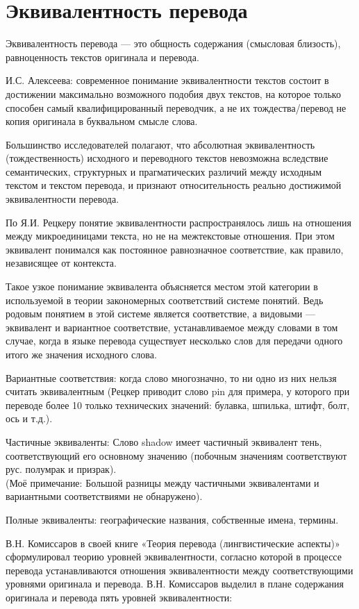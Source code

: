 \section{Эквивалентность перевода}

Эквивалентность перевода --- это общность содержания (смысловая близость), равноценность текстов оригинала и перевода.

И.С. Алексеева: современное понимание эквивалентности текстов состоит в достижении максимально возможного подобия двух текстов, на которое только способен самый квалифицированный переводчик, а не их тождества/перевод не копия оригинала в буквальном смысле слова.

Большинство исследователей полагают, что абсолютная эквивалентность (тождественность) исходного и переводного текстов невозможна вследствие семантических, структурных и прагматических различий между исходным текстом и текстом перевода, и признают относительность реально достижимой эквивалентности перевода.

По Я.И. Рецкеру понятие эквивалентности распространялось лишь на отношения между микроединицами текста, но не на межтекстовые отношения. При этом эквивалент понимался как постоянное равнозначное соответствие, как правило, независящее от контекста.

Такое узкое понимание эквивалента объясняется местом этой категории в используемой в теории закономерных соответствий системе понятий. Ведь родовым понятием в этой системе является соответствие, а видовыми --- эквивалент и вариантное соответствие, устанавливаемое между словами в том случае, когда в языке перевода существует несколько слов для передачи одного итого же значения исходного слова.

Вариантные соответствия: когда слово многозначно, то ни одно из них нельзя считать эквивалентным (Рецкер приводит слово pin для примера, у которого при переводе более 10 только технических значений: булавка, шпилька, штифт, болт, ось и т.д.).  

Частичные эквиваленты: Слово shadow имеет частичный эквивалент тень, соответствующий его основному значению (побочным значениям соответствуют рус. полумрак и призрак).\\
(Моё примечание: Большой разницы между частичными эквивалентами и вариантными соответствиями не обнаружено).

Полные эквиваленты: географические названия, собственные имена, термины.

В.Н. Комиссаров в своей книге «Теория перевода (лингвистические аспекты)» сформулировал теорию уровней эквивалентности, согласно которой в процессе перевода устанавливаются отношения эквивалентности между соответствующими уровнями оригинала и перевода. В.Н. Комиссаров выделил в плане содержания оригинала и перевода пять уровней эквивалентности: 

